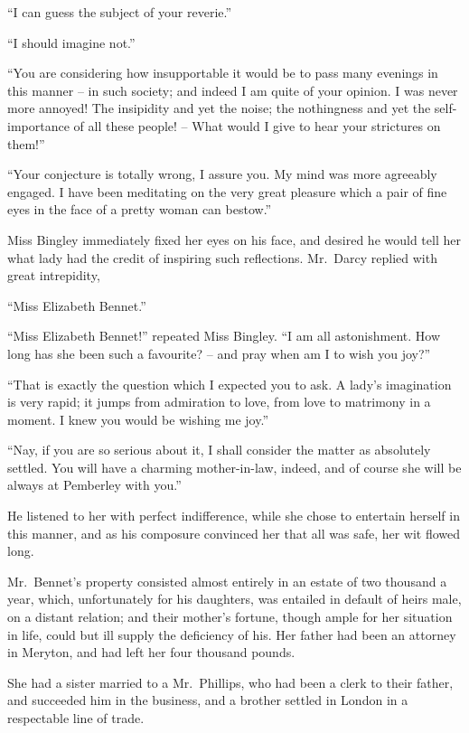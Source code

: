 “I can guess the subject of your reverie.”

“I should imagine not.”

“You are considering how insupportable it would be
to pass many evenings in this manner -- in such society;
and indeed I am quite of your opinion. I was never
more annoyed! The insipidity and yet the noise; the
nothingness and yet the self-importance of all these
people! -- What would I give to hear your strictures on
them!”

“Your conjecture is totally wrong, I assure you. My
mind was more agreeably engaged. I have been meditating
on the very great pleasure which a pair of fine eyes
in the face of a pretty woman can bestow.”

Miss Bingley immediately fixed her eyes on his face,
and desired he would tell her what lady had the credit
of inspiring such reflections. Mr.\ Darcy replied with
great intrepidity,

“Miss Elizabeth Bennet.”

“Miss Elizabeth Bennet!” repeated Miss Bingley.
“I am all astonishment. How long has she been such
a favourite? -- and pray when am I to wish you joy?”

“That is exactly the question which I expected you
to ask. A lady’s imagination is very rapid; it jumps
from admiration to love, from love to matrimony in a
moment. I knew you would be wishing me joy.”

“Nay, if you are so serious about it, I shall consider
the matter as absolutely settled. You will have a charming
mother-in-law, indeed, and of course she will be always
at Pemberley with you.”

He listened to her with perfect indifference, while she
chose to entertain herself in this manner, and as his composure
convinced her that all was safe, her wit flowed long.


Mr.\ Bennet’s property consisted almost entirely in an
estate of two thousand a year, which, unfortunately for
his daughters, was entailed in default of heirs male, on
a distant relation; and their mother’s fortune, though
ample for her situation in life, could but ill supply the
deficiency of his. Her father had been an attorney in
Meryton, and had left her four thousand pounds.

She had a sister married to a Mr.\ Phillips, who had
been a clerk to their father, and succeeded him in the
business, and a brother settled in London in a respectable
line of trade.

